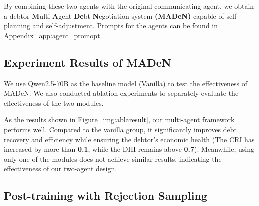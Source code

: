 By combining these two agents with the original communicating agent, we obtain a debtor \textbf{M}ulti-\textbf{A}gent \textbf{De}bt \textbf{N}egotiation system \textbf{(MADeN)} capable of self-planning and self-adjustment. Prompts for the agents can be found in Appendix~\ref{app:agent_promopt}.

\subsection{Experiment Results of MADeN}

We use Qwen2.5-70B as the baseline model (Vanilla) to test the effectiveness of MADeN. We also conducted ablation experiments to separately evaluate the effectiveness of the two modules. 

As the results shown in Figure~\ref{img:ablaresult}, our multi-agent framework performs well. Compared to the vanilla group, it significantly improves debt recovery and efficiency while ensuring the debtor’s economic health (The CRI has increased by more than \textbf{0.1}, while the DHI remains above \textbf{0.7}). Meanwhile, using only one of the modules does not achieve similar results, indicating the effectiveness of our two-agent design.



\begin{table}[ht]
\centering
\vspace{-0.1in}
\caption{\label{img:ablaresult}The performances of our framework}

\vspace{-0.1in}
\end{table}

\subsection{Post-training with Rejection Sampling} \label{sec:post}

